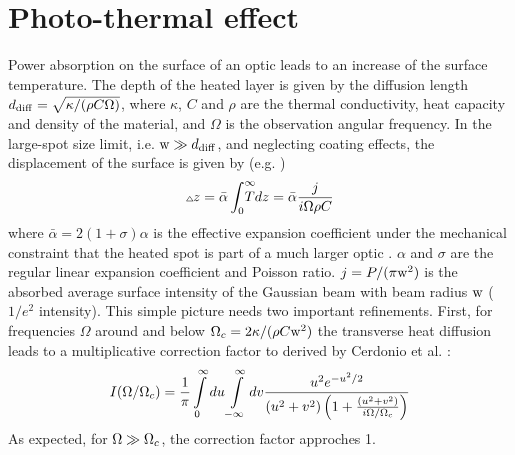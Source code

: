 \section{Photo-thermal effect}
\label{sec:PTE}
Power absorption on the surface of an optic leads to an increase of the surface temperature. The depth of the heated layer is given by the diffusion length $d_{\rm diff}=\sqrt{\kappa/(\rho C \Omega)}$, where $\kappa$, $C$ and $\rho$ are the thermal conductivity, heat capacity and density of the material, and $\Omega$ is the observation angular frequency. In the large-spot size limit, i.e. ${\rm w} \gg d_{\rm diff}$, and neglecting coating effects,
the displacement of the surface is given by (e.g. \cite{PhysRevD.63.082003,PhysRevD.91.023010})
\begin{equation}
\label{eq:simple}
{}_{{}^\triangle}\! z = \bar{\alpha} \int_0^\infty \!\!\!\!\!\!T dz = \bar{\alpha} \frac{j}{i {{\Omega}} \rho C}
\end{equation}
where $\bar{\alpha}=2(1+\sigma) \alpha$ is the effective expansion coefficient under the mechanical constraint that the heated spot is part of a much larger optic \cite{PhysRevD.78.102003,PhysRevD.70.082003}. $\alpha$ and  $\sigma$ are the regular linear expansion coefficient and Poisson ratio. $j=P/(\pi {\rm w}^2)$ is the absorbed average surface intensity of the Gaussian beam with beam radius ${\rm w}$ ($1/e^2$ intensity). This simple picture needs two important refinements. First, for frequencies  $\Omega$ around and below ${{\Omega}}_c=2 \kappa/(\rho C {\rm w}^2)$ the transverse heat diffusion leads to a multiplicative correction factor to 
derived by  Cerdonio et al. \cite{PhysRevD.63.082003}:
\begin{equation}
\label{eq:Cerdonio}
I({{\Omega}}/{{\Omega}}_c) = \frac{1}{\pi} \int\limits_0^\infty du \int\limits_{-\infty}^\infty dv \frac{u^2 e^{-u^2/2}}{(u^2+v^2)\left(1+\frac{(u^2+v^2)}{i {{\Omega}}/{{\Omega}}_c} \right) }
\end{equation}
As expected, for ${{\Omega}} \gg {{\Omega}}_c$, the correction factor approches 1. 
